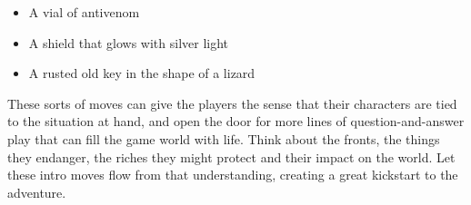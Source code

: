 \begin{itemize}
\item A vial of antivenom
\item A shield that glows with silver light
\item A rusted old key in the shape of a lizard

\end{itemize}


These sorts of moves can give the players the sense that their characters are tied to the situation at hand, and open the door for more lines of question-and-answer play that can fill the game world with life. Think about the fronts, the things they endanger, the riches they might protect and their impact on the world. Let these intro moves flow from that understanding, creating a great kickstart to the adventure.


